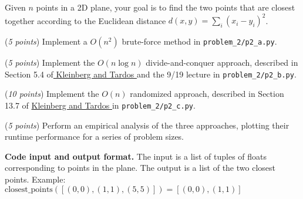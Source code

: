 \documentclass{hw}
\newcommand{\io}{\textbf{Code input and output format.} }
\begin{document}
\newpage

\newcommand{\rank}{\textnormal{rank}}
\newcommand{\Colon}{:}
\newcommand{\dotdot}{..}
\newcommand{\numinv}{\textrm{NI}}
\newcommand{\numlargeinv}{\textrm{NLI}}

\begin{problem}
  Given $n$ points in a 2D plane, your goal is to find the two points that are closest together
  according to the Euclidean distance $d(x,y) = \sum_i (x_i - y_i)^2$.

  \begin{subproblem}
    (\textit{5 points}) Implement a $O(n^2)$ brute-force method in \texttt{problem\_2/p2\_a.py}.
  \end{subproblem}

  \begin{subproblem}
    (\textit{5 points}) Implement the $O(n \log n)$ divide-and-conquer approach,
    described in Section 5.4 of\href{https://theswissbay.ch/pdf/Gentoomen%20Library/Algorithms/Algorithm%20Design%20-%20John%20Kleinberg%20-%20%C3%89va%20Tardos.pdf}{ Kleinberg and Tardos }and the 9/19 lecture in \texttt{problem\_2/p2\_b.py}.
  \end{subproblem}

  \begin{subproblem}
    (\textit{10 points}) Implement the $O(n)$ randomized approach,
    described in Section 13.7 of \href{https://theswissbay.ch/pdf/Gentoomen%20Library/Algorithms/Algorithm%20Design%20-%20John%20Kleinberg%20-%20%C3%89va%20Tardos.pdf}{ Kleinberg and Tardos } in \texttt{problem\_2/p2\_c.py}.
  \end{subproblem}

  \begin{subproblem}
      (\textit{5 points})
      Perform an empirical analysis of the three approaches,
      plotting their runtime performance for a series of problem sizes.
  \end{subproblem}

  \io The input is a list of tuples of floats corresponding to points in the plane.
  The output is a list of the two closest points.
  Example: $\text{closest\_points}([(0,0), (1,1), (5,5)]) = [(0,0), (1,1)]$
\end{problem}

\newpage

\end{document}
